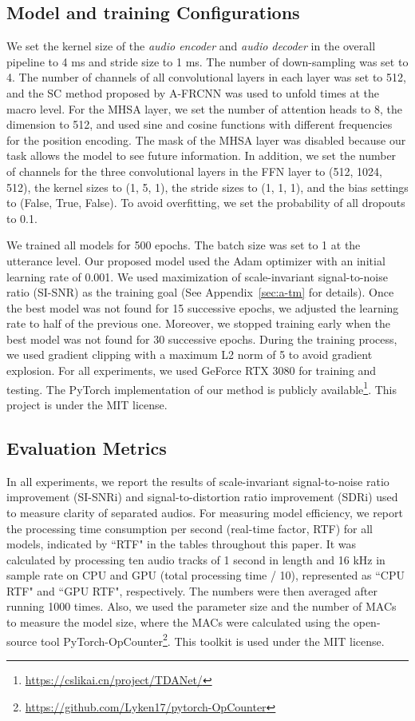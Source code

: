 \documentclass{article} \usepackage{iclr2023_conference,times}
\begin{document}
\subsection{Model and training Configurations}
We set the kernel size  of the \textit{audio encoder} and \textit{audio decoder} in the overall pipeline to 4 ms and stride size  to 1 ms. The number of down-sampling  was set to 4. The number of channels  of all convolutional layers in each layer was set to 512, and the SC method proposed by A-FRCNN \citep{hu2021speech} was used to unfold  times at the macro level. For the MHSA layer, we set the number of attention heads to 8, the dimension to 512, and used sine and cosine functions with different frequencies for the position encoding. The mask of the MHSA layer was disabled because our task allows the model to see future information. In addition, we set the number of channels for the three convolutional layers in the FFN layer to (512, 1024, 512), the kernel sizes to (1, 5, 1), the stride sizes to (1, 1, 1), and the bias settings to (False, True, False). To avoid overfitting, we set the probability of all dropouts to 0.1.

We trained all models for 500 epochs. The batch size was set to 1 at the utterance level. Our proposed model used the Adam \citep{kingma2015adam} optimizer with an initial learning rate of 0.001. We used maximization of scale-invariant signal-to-noise ratio (SI-SNR) \citep{hershey2016deep} as the training goal (See Appendix~\ref{sec:a-tm} for details). Once the best model was not found for 15 successive epochs, we adjusted the learning rate to half of the previous one. Moreover, we stopped training early when the best model was not found for 30 successive epochs. During the training process, we used gradient clipping with a maximum L2 norm of 5 to avoid gradient explosion. For all experiments, we used  GeForce RTX 3080 for training and testing. The PyTorch implementation of our method is publicly available\footnote{\url{https://cslikai.cn/project/TDANet/}}. This project is under the MIT license.

\subsection{Evaluation Metrics}
In all experiments, we report the results of scale-invariant signal-to-noise ratio improvement (SI-SNRi) \citep{le2019sdr} and signal-to-distortion ratio improvement (SDRi) \citep{vincent2006performance} used to measure clarity of separated audios. For measuring model efficiency, we report the processing time consumption per second (real-time factor, RTF) for all models, indicated by ``RTF" in the tables throughout this paper. It was calculated by processing ten audio tracks of 1 second in length and 16 kHz in sample rate on CPU and GPU (total processing time / 10), represented as ``CPU RTF" and ``GPU RTF", respectively. The numbers were then averaged after running 1000 times. Also, we used the parameter size and the number of MACs to measure the model size, where the MACs were calculated using the open-source tool PyTorch-OpCounter\footnote{\url{https://github.com/Lyken17/pytorch-OpCounter}}. This toolkit is used under the MIT license.
\end{document}
